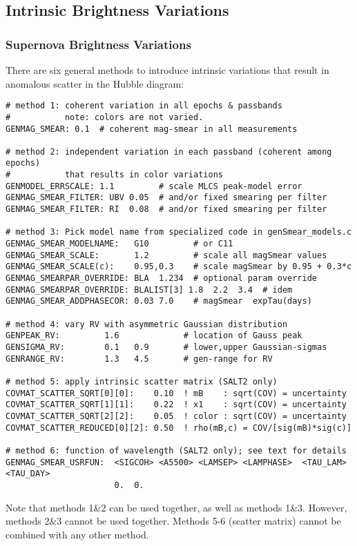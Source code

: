 \documentclass[12pt]{article}
\begin{document}
{%
   \clearpage
   \subsection{Intrinsic Brightness Variations}
   \label{subsec:magsmear}

\subsubsection{Supernova Brightness Variations}
\label{sss:SNmagsmear}

There are six general methods to introduce intrinsic variations
that result in anomalous scatter in the Hubble diagram:
%
\begin{Verbatim}[frame=single]
# method 1: coherent variation in all epochs & passbands
#           note: colors are not varied.
GENMAG_SMEAR: 0.1  # coherent mag-smear in all measurements

# method 2: independent variation in each passband (coherent among epochs)
#           that results in color variations
GENMODEL_ERRSCALE: 1.1         # scale MLCS peak-model error
GENMAG_SMEAR_FILTER: UBV 0.05  # and/or fixed smearing per filter
GENMAG_SMEAR_FILTER: RI  0.08  # and/or fixed smearing per filter

# method 3: Pick model name from specialized code in genSmear_models.c
GENMAG_SMEAR_MODELNAME:   G10         # or C11 
GENMAG_SMEAR_SCALE:       1.2         # scale all magSmear values
GENMAG_SMEAR_SCALE(c):    0.95,0.3    # scale magSmear by 0.95 + 0.3*c
GENMAG_SMEARPAR_OVERRIDE: BLA  1.234  # optional param override
GENMAG_SMEARPAR_OVERRIDE: BLALIST[3] 1.8  2.2  3.4  # idem
GENMAG_SMEAR_ADDPHASECOR: 0.03 7.0    # magSmear  expTau(days)

# method 4: vary RV with asymmetric Gaussian distribution
GENPEAK_RV:         1.6             # location of Gauss peak
GENSIGMA_RV:        0.1   0.9       # lower,upper Gaussian-sigmas
GENRANGE_RV:        1.3   4.5       # gen-range for RV

# method 5: apply intrinsic scatter matrix (SALT2 only)
COVMAT_SCATTER_SQRT[0][0]:    0.10  ! mB    : sqrt(COV) = uncertainty
COVMAT_SCATTER_SQRT[1][1]:    0.22  ! x1    : sqrt(COV) = uncertainty
COVMAT_SCATTER_SQRT[2][2]:    0.05  ! color : sqrt(COV) = uncertainty
COVMAT_SCATTER_REDUCED[0][2]: 0.50  ! rho(mB,c) = COV/[sig(mB)*sig(c)]

# method 6: function of wavelength (SALT2 only); see text for details
GENMAG_SMEAR_USRFUN:  <SIGCOH> <A5500> <LAMSEP> <LAMPHASE>  <TAU_LAM>  <TAU_DAY>  
                      0.  0.
\end{Verbatim}
%
Note that methods 1\&2 can be used together, as well as
methods 1\&3. However, methods 2\&3 cannot be used together.
Methods 5-6 (scatter matrix) cannot be combined with any other method.

}
\end{document}
